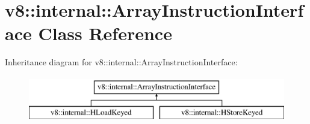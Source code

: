\hypertarget{classv8_1_1internal_1_1_array_instruction_interface}{}\section{v8\+:\+:internal\+:\+:Array\+Instruction\+Interface Class Reference}
\label{classv8_1_1internal_1_1_array_instruction_interface}
Inheritance diagram for v8\+:\+:internal\+:\+:Array\+Instruction\+Interface\+:\begin{figure}[H]
\begin{center}
\leavevmode
\includegraphics[height=2.000000cm]{classv8_1_1internal_1_1_array_instruction_interface}
\end{center}
\end{figure}
